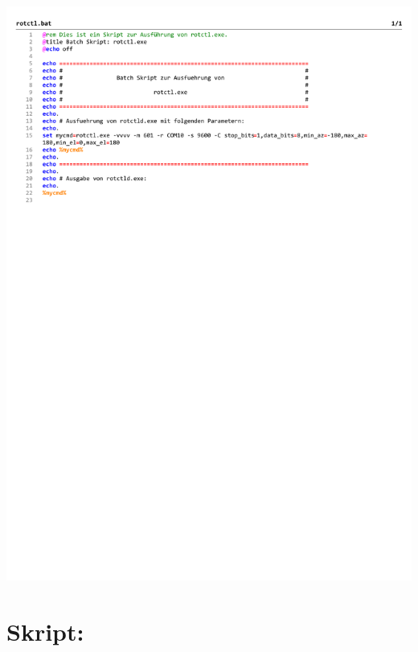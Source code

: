 \begin{center}
	\includegraphics[width=1\textwidth]{./appendicies/rotctl}
\end{center}


\chapter{Skript: }
\label{chap:rigctlddummybat}

